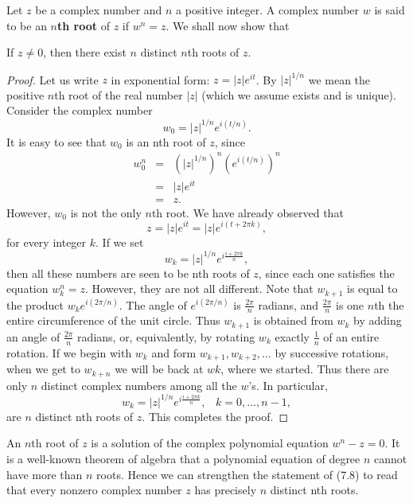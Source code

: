 Let $z$ be a complex number and $n$ a positive integer. A complex number $w$ is said to be an \textbf{$n$th root} of $z$ if $w^n = z$. We shall now show that

\begin{theorem} %
If $z \neq 0$, then there exist $n$ distinct $n$th roots of $z$.
\end{theorem}


\begin{proof}
Let us write $z$ in exponential form: $z = |z| e^{it}$. By $|z|^{1/n}$ we mean the positive $n$th root of the real number $|z|$ (which we assume exists and is unique). Consider the complex number
$$
w_0 = |z|^{1/n} e^{i(t/n)}.
$$
It is easy to see that $w_0$ is an nth root of $z$, since
\begin{eqnarray*}
w_{0}^{n} &=&  (|z|^{1/n})^{n} (e^{i(t/n)})^n \\
                &=& |z|e^{it} \\
                &=& z . 
\end{eqnarray*}
However, $w_0$ is not the only $n$th root. We have already observed that 
$$
z = |z| e^{it} = |z| e^{i(t + 2\pi k)},
$$
for every integer $k$. If we set 
$$
w_{k} = |z|^{1/n} e^{i\frac{i + 2\pi k}{n}} ,
$$
then all these numbers are seen to be nth roots of $z$, since each one satisfies 
the equation $w_{k}^{n} = z$. However, they are not all different. Note that $w_{k+1}$ is
equal to the product $w_{k}e^{i(2\pi/n)}$. The angle of $e^{i(2\pi/n)}$ is $\frac{2\pi}{n}$ radians, and $\frac{2\pi}{n}$ is one $n$th the entire circumference of the unit circle. Thus $w_{k+1}$ is obtained from $w_k$ by adding an angle of $\frac{2\pi}{n}$ radians, or, equivalently, by rotating $w_k$ exactly $\frac{1}{n}$ of an entire rotation. If we begin with $w_k$ and form $w_{k+1}, w_{k+2}, . . . $ by successive rotations, when we get to $w_{k+n}$ we will be back at $wk$, where we started. Thus there are only $n$ distinct complex numbers among all the $w$'s. In particular,
$$
w_{k} = |z|^{1/n} e^{i\frac{i + 2\pi k}{n}}, \;\;\;  k = 0, . . ., n - 1, 
$$
are $n$ distinct nth roots of $z$. This completes the proof.
\end{proof}

An $n$th root of $z$ is a solution of the complex polynomial equation $w^n - z = 0$. It is a well-known theorem of algebra that a polynomial equation of degree $n$ cannot have more than $n$ roots. Hence we can strengthen the statement of (7.8) to read that every nonzero complex number $z$ has precisely $n$ distinct nth roots.

